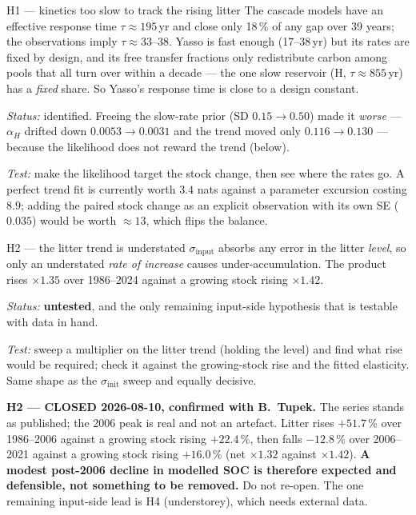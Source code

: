 \documentclass[11pt]{article}
\newcommand{\sinit}{\sigma_{\mathrm{init}}}
\newcommand{\sinput}{\sigma_{\mathrm{input}}}
\begin{document}
\begin{hyp}{H1 --- kinetics too slow to track the rising litter}
The cascade models have an effective response time $\tau \approx 195$\,yr and close only 18\,\% of
any gap over 39 years; the observations imply $\tau \approx 33$--$38$. Yasso is fast enough
(17--38\,yr) but its rates are fixed by design, and its free transfer fractions only redistribute
carbon among pools that all turn over within a decade --- the one slow reservoir (H, $\tau\approx855$\,yr)
has a \emph{fixed} share. So Yasso's response time is close to a design constant.

\emph{Status:} identified. Freeing the slow-rate prior (SD $0.15\rightarrow0.50$) made it
\emph{worse} --- $\alpha_H$ drifted down $0.0053\rightarrow0.0031$ and the trend moved only
$0.116\rightarrow0.130$ --- because the likelihood does not reward the trend (below).

\emph{Test:} make the likelihood target the stock change, then see where the rates go. A perfect
trend fit is currently worth $3.4$ nats against a parameter excursion costing $8.9$; adding the
paired stock change as an explicit observation with its own SE ($0.035$) would be worth
$\approx13$, which flips the balance.
\end{hyp}

\begin{hyp}{H2 --- the litter trend is understated}
$\sinput$ absorbs any error in the litter \emph{level}, so only an understated \emph{rate of
increase} causes under-accumulation. The product rises $\times1.35$ over 1986--2024 against a
growing stock rising $\times1.42$.

\emph{Status:} \textbf{untested}, and the only remaining input-side hypothesis that is testable
with data in hand.

\emph{Test:} sweep a multiplier on the litter trend (holding the level) and find what rise would
be required; check it against the growing-stock rise and the fitted elasticity. Same shape as the
$\sinit$ sweep and equally decisive.
\end{hyp}

\begin{caveat}
\textbf{H2 --- CLOSED 2026-08-10, confirmed with B.~Tupek.} The series stands as published; the 2006
peak is real and not an artefact. Litter rises $+51.7$\,\% over 1986--2006 against a growing stock
rising $+22.4$\,\%, then falls $-12.8$\,\% over 2006--2021 against a growing stock rising
$+16.0$\,\% (net $\times1.32$ against $\times1.42$). \textbf{A modest post-2006 decline in modelled
SOC is therefore expected and defensible, not something to be removed.} Do not re-open. The one
remaining input-side lead is H4 (understorey), which needs external data.
\end{caveat}
\end{document}

